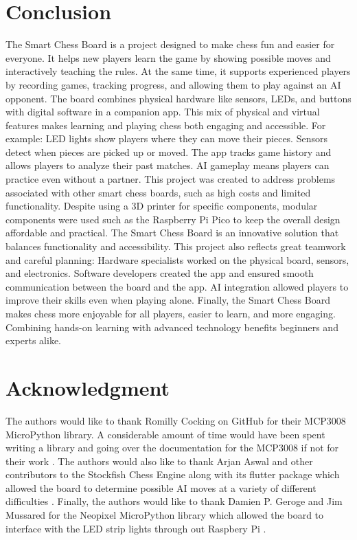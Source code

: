 \documentclass[11pt,journal]{IEEEtran}
\begin{document}
% 


\section{Conclusion}
The Smart Chess Board is a project designed to make chess fun and easier for everyone. It helps new players learn the game by showing possible moves and interactively teaching the rules. At the same time, it supports experienced players by recording games, tracking progress, and allowing them to play against an AI opponent.
The board combines physical hardware like sensors, LEDs, and buttons with digital software in a companion app. This mix of physical and virtual features makes learning and playing chess both engaging and accessible. For example:
LED lights show players where they can move their pieces.
Sensors detect when pieces are picked up or moved.
The app tracks game history and allows players to analyze their past matches.
AI gameplay means players can practice even without a partner.
This project was created to address problems associated with other smart chess boards, such as high costs and limited functionality. Despite using a 3D printer for specific components, modular components were used such as the Raspberry Pi Pico to keep the overall design affordable and practical. The Smart Chess Board is an innovative solution that balances functionality and accessibility.
This project also reflects great teamwork and careful planning:
Hardware specialists worked on the physical board, sensors, and electronics.
Software developers created the app and ensured smooth communication between the board and the app.
AI integration allowed players to improve their skills even when playing alone.
Finally, the Smart Chess Board makes chess more enjoyable for all players, easier to learn, and more engaging. Combining hands-on learning with advanced technology benefits beginners and experts alike.


\section*{Acknowledgment}

The authors would like to thank Romilly Cocking on GitHub for their MCP3008 MicroPython library. A considerable amount of time would have been spent writing a library and going over the documentation for the MCP3008 if not for their work \cite{cocking_pico_code_2023}. The authors would also like to thank Arjan Aswal and other contributors to the Stockfish Chess Engine along with its flutter package which allowed the board to determine possible AI moves at a variety of different difficulties \cite{stockfish}. Finally, the authors would like to thank Damien P. Geroge and Jim Mussared for the Neopixel MicroPython library which allowed the board to interface with the LED strip lights through out Raspbery Pi \cite{neopixel}.




\end{document}
